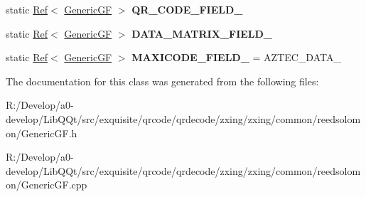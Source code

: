 \begin{DoxyCompactItemize}
\item 
\mbox{\label{classzxing_1_1_generic_g_f_a9222538bd53fc45b4dfbb8f77348819f}} 
static \mbox{\hyperlink{classzxing_1_1_ref}{Ref}}$<$ \mbox{\hyperlink{classzxing_1_1_generic_g_f}{Generic\+GF}} $>$ {\bfseries Q\+R\+\_\+\+C\+O\+D\+E\+\_\+\+F\+I\+E\+L\+D\+\_}
\item 
\mbox{\label{classzxing_1_1_generic_g_f_ac314916f75ce2a9a44e2e1db6048a33a}} 
static \mbox{\hyperlink{classzxing_1_1_ref}{Ref}}$<$ \mbox{\hyperlink{classzxing_1_1_generic_g_f}{Generic\+GF}} $>$ {\bfseries D\+A\+T\+A\+\_\+\+M\+A\+T\+R\+I\+X\+\_\+\+F\+I\+E\+L\+D\+\_}
\item 
\mbox{\label{classzxing_1_1_generic_g_f_a2fce74cdd9fd5d550e33b54d0b0b6bcd}} 
static \mbox{\hyperlink{classzxing_1_1_ref}{Ref}}$<$ \mbox{\hyperlink{classzxing_1_1_generic_g_f}{Generic\+GF}} $>$ {\bfseries M\+A\+X\+I\+C\+O\+D\+E\+\_\+\+F\+I\+E\+L\+D\+\_} = A\+Z\+T\+E\+C\+\_\+\+D\+A\+T\+A\+\_
\end{DoxyCompactItemize}


The documentation for this class was generated from the following files\+:\begin{DoxyCompactItemize}
\item 
R\+:/\+Develop/a0-\/develop/\+Lib\+Q\+Qt/src/exquisite/qrcode/qrdecode/zxing/zxing/common/reedsolomon/Generic\+G\+F.\+h\item 
R\+:/\+Develop/a0-\/develop/\+Lib\+Q\+Qt/src/exquisite/qrcode/qrdecode/zxing/zxing/common/reedsolomon/Generic\+G\+F.\+cpp\end{DoxyCompactItemize}
